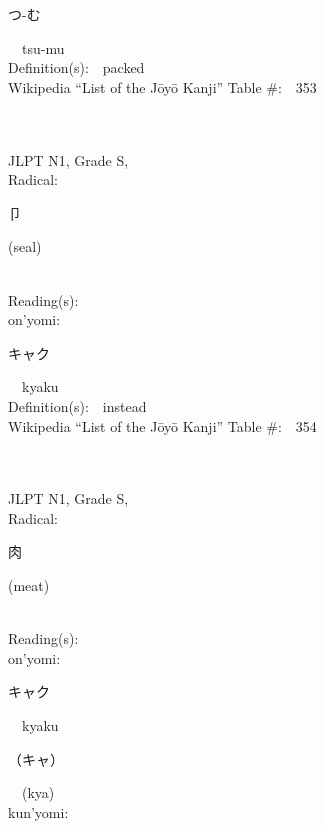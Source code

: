 \begin{multicols}{2}
{\hspace*{2em}}{\begin{CJK}{UTF8}{min} つ-む \end{CJK}}\ \ tsu-mu\ \ \\
Definition(s):\ \ packed \\
Wikipedia ``List of the J\=oy\=o Kanji'' Table \#:\ \ 353 \\
\ \ \\
{\fontsize{34pt}{40pt}  }\ \ \\
{JLPT N1, Grade S, \\Radical:\ \ {\begin{CJK}{UTF8}{min} 卩 \end{CJK}} (seal) } \\
Reading(s):\ \ \\
{\hspace*{1em}}on'yomi:\ \ \\
{\hspace*{2em}}{\begin{CJK}{UTF8}{min} キャク \end{CJK}}\ \ kyaku\ \ \\
Definition(s):\ \ instead \\
Wikipedia ``List of the J\=oy\=o Kanji'' Table \#:\ \ 354 \\
\ \ \\
{\fontsize{34pt}{40pt}  }\ \ \\
{JLPT N1, Grade S, \\Radical:\ \ {\begin{CJK}{UTF8}{min} 肉 \end{CJK}} (meat) } \\
Reading(s):\ \ \\
{\hspace*{1em}}on'yomi:\ \ \\
{\hspace*{2em}}{\begin{CJK}{UTF8}{min} キャク \end{CJK}}\ \ kyaku\ \ \\
{\hspace*{2em}}{\begin{CJK}{UTF8}{min} （キャ） \end{CJK}}\ \ (kya)\ \ \\
{\hspace*{1em}}kun'yomi:\ \ \\

\end{multicols}
